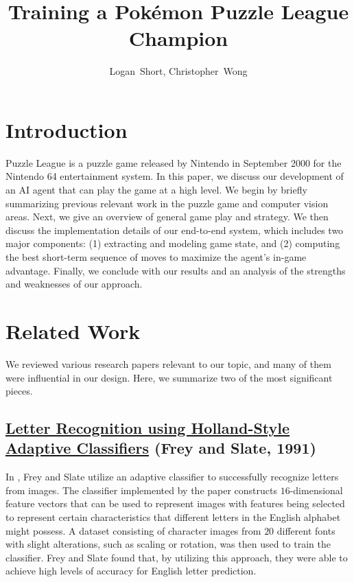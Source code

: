 \documentclass[12pt]{IEEEtran}
\begin{document}
\title{Training a Pok\'{e}mon Puzzle League Champion}
\author{Logan~Short, Christopher~Wong}%
\maketitle


\section{Introduction}
 Puzzle League is a puzzle game released by Nintendo in September 2000 for the Nintendo 64 entertainment system. In this paper, we discuss our development of an AI agent that can play the game at a high level. We begin by briefly summarizing previous relevant work in the puzzle game and computer vision areas. Next, we give an overview of general game play and strategy. We then discuss the implementation details of our end-to-end system, which includes two major components: (1) extracting and modeling game state, and (2) computing the best short-term sequence of moves to maximize the agent's in-game advantage. Finally, we conclude with our results and an analysis of the strengths and weaknesses of our approach.

\section{Related Work}
We reviewed various research papers relevant to our topic, and many of them were influential in our design. Here, we summarize two of the most significant pieces.

\subsection{\href{https://http://cns-classes.bu.edu/cn550/Readings/frey-slate-91.pdf}{Letter Recognition using Holland-Style Adaptive Classifiers} (Frey and Slate, 1991)}
In \cite{1}, Frey and Slate utilize an adaptive classifier to successfully recognize letters from images. The classifier implemented by the paper constructs $16$-dimensional feature vectors that can be used to represent images with features being selected to represent certain characteristics that different letters in the English alphabet might possess. A dataset consisting of character images from $20$ different fonts with slight alterations, such as scaling or rotation, was then used to train the classifier. Frey and Slate found that, by utilizing this approach, they were able to achieve high levels of accuracy for English letter prediction.
\end{document}

